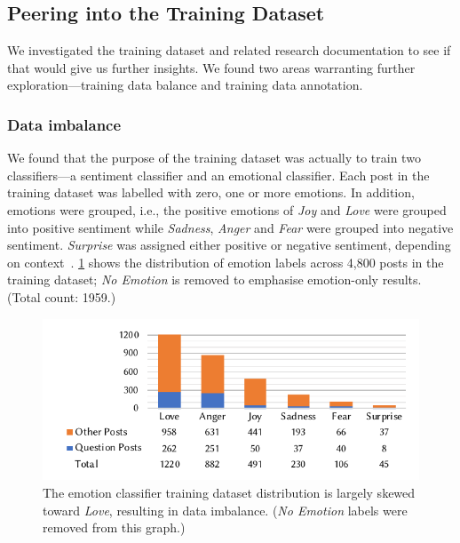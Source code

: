 \subsection{Peering into the Training Dataset}
We investigated the training dataset and related research documentation to see if that would give us further insights.  We found two areas warranting further exploration---training data balance and training data annotation. 

\subsubsection{Data imbalance}
 We found that the purpose of the training dataset was actually to train two classifiers---a sentiment classifier and an emotional classifier.  Each post in the training dataset was labelled with zero, one or more emotions. In addition, emotions were grouped, i.e., the positive emotions of \textit{Joy} and \textit{Love} were grouped into positive sentiment while \textit{Sadness}, \textit{Anger} and \textit{Fear} were grouped into negative sentiment. \textit{Surprise} was assigned either positive or negative sentiment, depending on context~\citep{novielli2018, calefato2018}.  \cref{ase2020-industry:fig:data-imbalance-training} shows the distribution of emotion labels across 4,800 posts in the training dataset; \textit{No Emotion} is removed to emphasise emotion-only results. (Total count: 1959.)

\begin{figure}
    \centering
    \includegraphics[width=.8\linewidth]{data-imbalance.pdf}
    \caption [Emotion classifier training data imbalance]{The emotion classifier training dataset distribution is largely skewed toward \textit{Love}, resulting in data imbalance. (\textit{No Emotion} labels were removed from this graph.)}
    \label{ase2020-industry:fig:data-imbalance-training}
\end{figure} 

